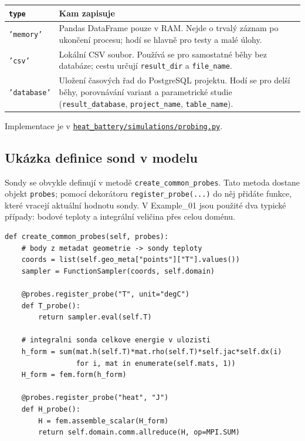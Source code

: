 \documentclass[a4paper,11pt]{article}
\newcommand{\GitHubProbingURL}{https://github.com/LiborKudela/heat-battery/blob/master/heat_battery/simulations/probing.py}
\newcommand{\GitHubProbing}{\href{\GitHubProbingURL}{\texttt{heat\_battery/simulations/probing.py}}}
\begin{document}
\begin{longtable}{@{}L{2.6cm} L{12.5cm}@{}}
\toprule
\texttt{type} & \textbf{Kam zapisuje} \\
\midrule
\endhead
\texttt{'memory'}    & Pandas DataFrame pouze v RAM. Nejde o trvalý záznam po
                       ukončení procesu; hodí se hlavně pro testy a malé úlohy. \\
\texttt{'csv'}       & Lokální CSV soubor. Používá se pro samostatné běhy bez
                       databáze; cestu určují \texttt{result\_dir} a
                       \texttt{file\_name}. \\
\texttt{'database'}  & Uložení časových řad do PostgreSQL projektu. Hodí se pro
                       delší běhy, porovnávání variant a parametrické studie
                       (\texttt{result\_database}, \texttt{project\_name},
                       \texttt{table\_name}). \\
\bottomrule
\end{longtable}

Implementace je v \GitHubProbing{}.

\subsection*{Ukázka definice sond v modelu}

Sondy se obvykle definují v metodě \texttt{create\_common\_probes}. Tato metoda
dostane objekt \texttt{probes}; pomocí dekorátoru
\texttt{register\_probe(...)} do něj přidáte funkce, které vracejí aktuální
hodnotu sondy. V Example\_01 jsou použité dva typické případy: bodové teploty a
integrální veličina přes celou doménu.

\begin{lstlisting}[style=py]
def create_common_probes(self, probes):
    # body z metadat geometrie -> sondy teploty
    coords = list(self.geo_meta["points"]["T"].values())
    sampler = FunctionSampler(coords, self.domain)

    @probes.register_probe("T", unit="degC")
    def T_probe():
        return sampler.eval(self.T)

    # integralni sonda celkove energie v ulozisti
    h_form = sum(mat.h(self.T)*mat.rho(self.T)*self.jac*self.dx(i)
                 for i, mat in enumerate(self.mats, 1))
    H_form = fem.form(h_form)

    @probes.register_probe("heat", "J")
    def H_probe():
        H = fem.assemble_scalar(H_form)
        return self.domain.comm.allreduce(H, op=MPI.SUM)
\end{lstlisting}
\end{document}
